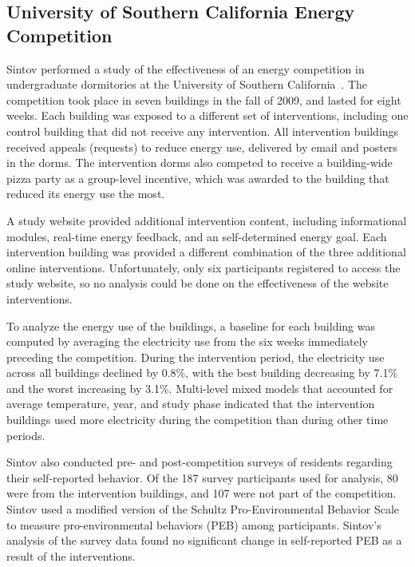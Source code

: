 \subsection{University of Southern California Energy Competition}

Sintov performed a study of the effectiveness of an energy competition in undergraduate dormitories at the University of Southern California~\cite{Sintov2011}. The competition took place in seven buildings in the fall of 2009, and lasted for eight weeks. Each building was exposed to a different set of interventions, including one control building that did not receive any intervention. All intervention buildings received appeals (requests) to reduce energy use, delivered by email and posters in the dorms. The intervention dorms also competed to receive a building-wide pizza party as a group-level incentive, which was awarded to the building that reduced its energy use the most.

A study website provided additional intervention content, including informational modules, real-time energy feedback, and an self-determined energy goal. Each intervention building was provided a different combination of the three additional online interventions. Unfortunately, only six participants registered to access the study website, so no analysis could be done on the effectiveness of the website interventions.

To analyze the energy use of the buildings, a baseline for each building was computed by averaging the electricity use from the six weeks immediately preceding the competition. During the intervention period, the electricity use across all buildings declined by 0.8\%, with the best building decreasing by 7.1\% and the worst increasing by 3.1\%. Multi-level mixed models that accounted for average temperature, year, and study phase indicated that the intervention buildings used more electricity during the competition than during other time periods.

Sintov also conducted pre- and post-competition surveys of residents regarding their self-reported behavior. Of the 187 survey participants used for analysis, 80 were from the intervention buildings, and 107 were not part of the competition. Sintov used a modified version of the Schultz Pro-Environmental Behavior Scale to measure pro-environmental behaviors (PEB) among participants. Sintov's analysis of the survey data found no significant change in self-reported PEB as a result of the interventions.

